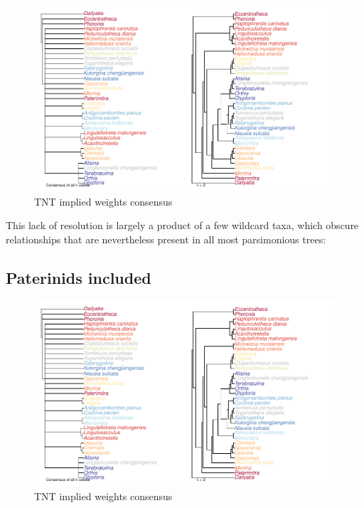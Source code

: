 \documentclass[]{book}
\theoremstyle{definition}
\theoremstyle{definition}
\theoremstyle{definition}
\theoremstyle{remark}
\begin{document}
\begin{figure}
\centering
\includegraphics{Brachiopod_phylogeny_files/figure-latex/unnamed-chunk-6-1.pdf}
\caption{\label{fig:unnamed-chunk-6}TNT implied weights consensus}
\end{figure}

This lack of resolution is largely a product of a few wildcard taxa,
which obscure relationships that are nevertheless present in all most
parsimonious trees:

\hypertarget{paterinids-included}{%
\subsection{Paterinids included}\label{paterinids-included}}

\begin{figure}
\centering
\includegraphics{Brachiopod_phylogeny_files/figure-latex/unnamed-chunk-7-1.pdf}
\caption{\label{fig:unnamed-chunk-7}TNT implied weights consensus}
\end{figure}
\end{document}
